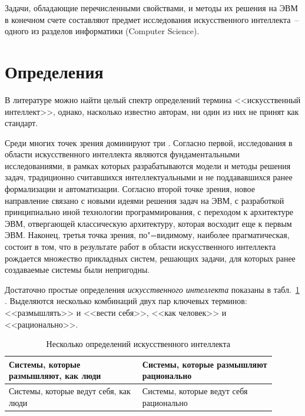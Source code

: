 \documentclass[a4paper,14pt, openany, twoside, draft]{extbook} %
\begin{document}
Задачи,  обладающие перечисленными свойствами, и методы их решения на ЭВМ в конечном счете составляют предмет исследования искусственного интеллекта~-- одного из разделов информатики (Computer Science).

\section{Определения}

В литературе можно найти целый спектр определений термина <<искусственный интеллект>>, однако, насколько известно авторам, ни один из них не принят как стандарт.

Среди многих точек зрения доминируют три \cite{AIDictionary}. Согласно первой, исследования в области искусственного интеллекта являются фундаментальными исследованиями, в рамках которых разрабатываются модели и методы решения задач, традиционно считавшихся интеллектуальными и не поддававшихся ранее формализации и автоматизации. Согласно второй точке зрения, новое направление связано с новыми идеями решения задач на ЭВМ, с разработкой принципиально иной технологии программирования, с переходом к архитектуре ЭВМ, отвергающей классическую архитектуру, которая восходит еще к первым ЭВМ. Наконец, третья точка зрения, по"=видимому, наиболее прагматическая, состоит в том, что в результате работ в области искусственного интеллекта рождается множество прикладных систем, решающих задачи, для которых ранее создаваемые системы были непригодны.

Достаточно простые определения {\em искусственного интеллекта} показаны в табл.~\ref{pic:determai} \cite{Russell}. Выделяются несколько комбинаций двух пар ключевых терминов: <<размышлять>> и <<вести себя>>, <<как человек>> и <<рационально>>.

\begin{table}[h]
\begin{center}
\caption{Несколько определений искусственного интеллекта} \label{pic:determai}%
\begin{tabular}{|p{0.45\linewidth}|p{0.45\linewidth}|}
 \hline
   Системы, которые размышляют, как люди
 &
   Системы, которые размышляют рационально
 \\ \hline
   Системы, которые ведут себя, как люди
 &
   Системы, которые ведут себя рационально
 \\  \hline
\end{tabular}
\end{center}
\end{table}
\end{document}
